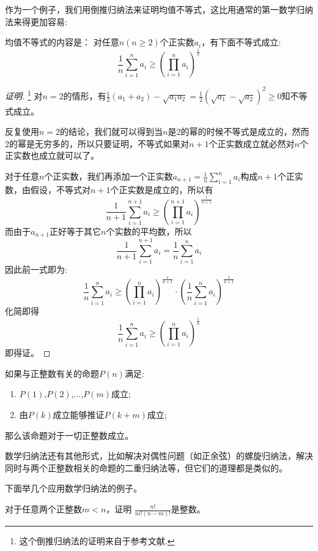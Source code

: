 \begin{example}[均值不等式]
作为一个例子，我们用倒推归纳法来证明均值不等式，这比用通常的第一数学归纳法来得更加容易:

  均值不等式的内容是： 对任意$n(n\geqslant2)$个正实数$a_i$，有下面不等式成立:
\[ \frac{1}{n}\sum_{i=1}^na_i \geqslant \left( \prod_{i=1}^na_i \right)^{\frac{1}{n}} \]

\begin{proof}[证明]\footnote{这个倒推归纳法的证明来自于参考文献\cite{the-secret-of-inequality}.}
  对$n=2$的情形，有$\frac{1}{2}(a_1+a_2)-\sqrt{a_1a_2}=\frac{1}{2}(\sqrt{a_1}-\sqrt{a_2})^2\geqslant 0$知不等式成立。

 反复使用$n=2$的结论，我们就可以得到当$n$是2的幂的时候不等式是成立的，然而2的幂是无穷多的，所以只要证明，不等式如果对$n+1$个正实数成立就必然对$n$个正实数也成立就可以了。

对于任意$n$个正实数，我们再添加一个正实数$a_{n+1}=\frac{1}{n}\sum_{i=1}^na_i$构成$n+1$个正实数，由假设，不等式对$n+1$个正实数是成立的，所以有
\[
\frac{1}{n+1}\sum_{i=1}^{n+1}a_i \geqslant \left( \prod_{i=1}^{n+1}a_i \right)^{\frac{1}{n+1}}
\]
而由于$a_{n+1}$正好等于其它$n$个实数的平均数，所以
\[ \frac{1}{n+1}\sum_{i=1}^{n+1}a_i = \frac{1}{n}\sum_{i=1}^{n}a_i \]
因此前一式即为:
\[
\frac{1}{n}\sum_{i=1}^{n}a_i \geqslant \left( \prod_{i=1}^{n}a_i \right)^{\frac{1}{n+1}} \cdot \left( \frac{1}{n}\sum_{i=1}^na_i \right)^{\frac{1}{n+1}}
\]
化简即得
\[
\frac{1}{n}\sum_{i=1}^na_i \geqslant \left( \prod_{i=1}^na_i \right)^{\frac{1}{n}} 
\]
即得证。
\end{proof}
\end{example}

\begin{principle}[跳跃数学归纳法]
  如果与正整数有关的命题$P(n)$满足:
  \begin{enumerate}
  \item $P(1)$,$P(2)$,$\ldots$,$P(m)$成立;
  \item 由$P(k)$成立能够推证$P(k+m)$成立;
  \end{enumerate}
那么该命题对于一切正整数成立。
\end{principle}

数学归纳法还有其他形式，比如解决对偶性问题（如正余弦）的螺旋归纳法，解决同时与两个正整数相关的命题的二重归纳法等，但它们的道理都是类似的。

下面举几个应用数学归纳法的例子。

\begin{example}
  对于任意两个正整数$m<n$，证明 $\frac{n!}{m!(n-m)!}$是整数。
\end{example}

